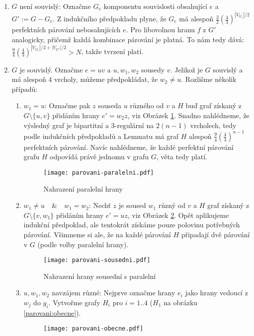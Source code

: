 \documentclass{article}
\begin{document}
\begin{enumerate}
	\item $G$ není souvislý: Označme $G_e$ komponentu souvislosti obsahující $e$ 
	a $G' := G - G_e$. Z indukčního předpokladu plyne, že $G_e$ má alespoň 
	$\frac{3}{2} \left( \frac{4}{3} \right)^{|V_{G_e}|/2}$ perfektních párování 
	nebosahujících $e$. Pro libovolnou hranu $f$ z $G'$ analogicky, přičemž 
	každá kombinace párování je platná. To nám tedy dává: 
	$\frac{9}{4}\left(\frac{4}{3}\right)^{|V_{G_e}|/2 + |V_{G'}|/2} > N$, takže 
	tvrzení platí.
	\item $G$ je souvislý. Označme $e = uv$ a $u,w_1,w_2$ sousedy $v$. Jelikož 
	je $G$ souvislý a má alespoň 4 vrcholy, můžeme předpokládat, že $w_2 \neq 
	u$. Rozlišme několik případů:
	\begin{enumerate}
		\item $w_1 = u$: Označme pak $z$ souseda $u$ různého od $v$ a $H$ buď 
		graf získaný z $G \setminus \{u,v\}$ přidáním hrany $e' = w_2z$, viz 
		Obrázek \ref{parovani:paralelni}. Snadno nahlédneme, že výsledný graf je 
		bipartitní a 3-regulární na $2(n-1)$ vrcholech, tedy podle indukčních 
		předpokladů a Lemmatu má graf $H$ alespoň 
		$\frac{9}{4}\left(\frac{4}{3}\right)^{n-1}$ perfektních párování. Navíc 
		nahlédneme, že každé perfektní párování grafu $H$ odpovídá právě jednomu 
		v grafu $G$, věta tedy platí.
\begin{figure}[H]
\centering
\texttt{[image: parovani-paralelni.pdf]}
\caption{Nahrazení paralelní hrany}
\label{parovani:paralelni}
\end{figure}
		\item $w_1 \neq u \quad\&\quad w_1 = w_2$: Nechť $z$ je soused $w_1$ 
		různý od $v$ a $H$ graf získaný z $G \setminus \{v,w_1\}$ přidáním hrany 
		$e' = uz$, viz Obrázek \ref{parovani:sousedni}. Opět aplikujeme indukční 
		předpoklad, ale tentokrát získáme pouze polovinu potřebných párování.  
		Všimneme si ale, že na každé párování $H$ připadají dvě párování v $G$ 
		(podle volby paralelní hrany).
\begin{figure}[H]
\centering
\texttt{[image: parovani-sousedni.pdf]}
\caption{Nahrazení hrany sousední s paralelní}
\label{parovani:sousedni}
\end{figure}
		\item $u, w_1, w_2$ navzájem různé: Nejprve označme hrany $e_i$ jako 
		hrany vedoucí z $w_j$ do $y_i$. Vytvořme grafy $H_i$ pro $i=1..4$ ($H_1$ 
		na obrázku \ref{parovani:obecne}).
\begin{figure}[H]
\centering
\texttt{[image: parovani-obecne.pdf]}

\end{figure}
\end{enumerate}
\end{enumerate}
\end{document}
